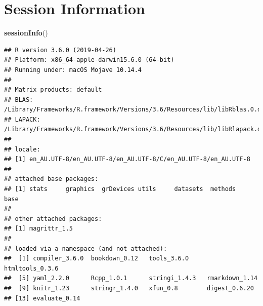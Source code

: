 \documentclass[]{book}
\newenvironment{Shaded}{\begin{snugshade}}{\end{snugshade}}
\newcommand{\KeywordTok}[1]{\textcolor[rgb]{0.13,0.29,0.53}{\textbf{#1}}}
\newcommand{\NormalTok}[1]{#1}
\begin{document}
\hypertarget{session-information}{%
\chapter{Session Information}\label{session-information}}

\begin{Shaded}
\begin{Highlighting}[]
\KeywordTok{sessionInfo}\NormalTok{()}
\end{Highlighting}
\end{Shaded}

\begin{verbatim}
## R version 3.6.0 (2019-04-26)
## Platform: x86_64-apple-darwin15.6.0 (64-bit)
## Running under: macOS Mojave 10.14.4
## 
## Matrix products: default
## BLAS:   /Library/Frameworks/R.framework/Versions/3.6/Resources/lib/libRblas.0.dylib
## LAPACK: /Library/Frameworks/R.framework/Versions/3.6/Resources/lib/libRlapack.dylib
## 
## locale:
## [1] en_AU.UTF-8/en_AU.UTF-8/en_AU.UTF-8/C/en_AU.UTF-8/en_AU.UTF-8
## 
## attached base packages:
## [1] stats     graphics  grDevices utils     datasets  methods   base     
## 
## other attached packages:
## [1] magrittr_1.5
## 
## loaded via a namespace (and not attached):
##  [1] compiler_3.6.0  bookdown_0.12   tools_3.6.0     htmltools_0.3.6
##  [5] yaml_2.2.0      Rcpp_1.0.1      stringi_1.4.3   rmarkdown_1.14 
##  [9] knitr_1.23      stringr_1.4.0   xfun_0.8        digest_0.6.20  
## [13] evaluate_0.14
\end{verbatim}


\end{document}
